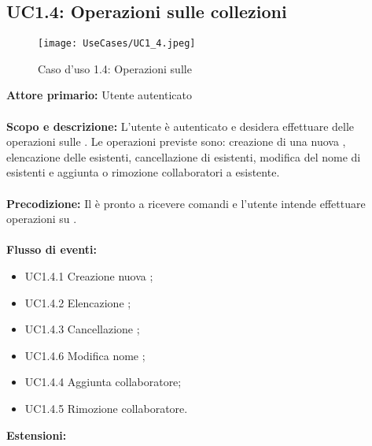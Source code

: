 \documentclass{scalatekids-article}
\begin{document}
\subsection{UC1.4: Operazioni sulle collezioni}
\begin{figure}[H]
  \begin{center}
    \texttt{[image: UseCases/UC1\_4.jpeg]}
    \caption{Caso d'uso 1.4: Operazioni sulle }
  \end{center}
\end{figure}
\textbf{Attore primario:} Utente autenticato\\ \\
\textbf{Scopo e descrizione:} L'utente è autenticato e desidera effettuare delle operazioni sulle . Le operazioni previste sono:
creazione di una nuova , elencazione delle  esistenti, cancellazione di  esistenti, modifica del nome di  esistenti e
aggiunta o rimozione collaboratori a  esistente.\\ \\
\textbf{Precodizione:} Il  è pronto a ricevere comandi e l'utente intende effettuare operazioni su .\\ \\
\textbf{Flusso di eventi:}
\begin{itemize}
\item UC1.4.1 Creazione nuova ;
\item UC1.4.2 Elencazione ;
\item UC1.4.3 Cancellazione ;
\item UC1.4.6 Modifica nome ;
\item UC1.4.4 Aggiunta collaboratore;
\item UC1.4.5 Rimozione collaboratore.
\end{itemize}
\textbf{Estensioni:}
\end{document}
